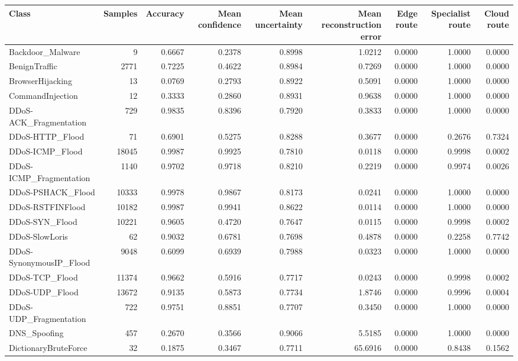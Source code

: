 \begin{tabular}{lrrrrrrrr}
\toprule
Class & Samples & Accuracy & Mean confidence & Mean uncertainty & Mean reconstruction error & Edge route & Specialist route & Cloud route \\
\midrule
Backdoor\_Malware & 9 & 0.6667 & 0.2378 & 0.8998 & 1.0212 & 0.0000 & 1.0000 & 0.0000 \\
BenignTraffic & 2771 & 0.7225 & 0.4622 & 0.8984 & 0.7269 & 0.0000 & 1.0000 & 0.0000 \\
BrowserHijacking & 13 & 0.0769 & 0.2793 & 0.8922 & 0.5091 & 0.0000 & 1.0000 & 0.0000 \\
CommandInjection & 12 & 0.3333 & 0.2860 & 0.8931 & 0.9638 & 0.0000 & 1.0000 & 0.0000 \\
DDoS-ACK\_Fragmentation & 729 & 0.9835 & 0.8396 & 0.7920 & 0.3833 & 0.0000 & 1.0000 & 0.0000 \\
DDoS-HTTP\_Flood & 71 & 0.6901 & 0.5275 & 0.8288 & 0.3677 & 0.0000 & 0.2676 & 0.7324 \\
DDoS-ICMP\_Flood & 18045 & 0.9987 & 0.9925 & 0.7810 & 0.0118 & 0.0000 & 0.9998 & 0.0002 \\
DDoS-ICMP\_Fragmentation & 1140 & 0.9702 & 0.9718 & 0.8210 & 0.2219 & 0.0000 & 0.9974 & 0.0026 \\
DDoS-PSHACK\_Flood & 10333 & 0.9978 & 0.9867 & 0.8173 & 0.0241 & 0.0000 & 1.0000 & 0.0000 \\
DDoS-RSTFINFlood & 10182 & 0.9987 & 0.9941 & 0.8622 & 0.0114 & 0.0000 & 1.0000 & 0.0000 \\
DDoS-SYN\_Flood & 10221 & 0.9605 & 0.4720 & 0.7647 & 0.0115 & 0.0000 & 0.9998 & 0.0002 \\
DDoS-SlowLoris & 62 & 0.9032 & 0.6781 & 0.7698 & 0.4878 & 0.0000 & 0.2258 & 0.7742 \\
DDoS-SynonymousIP\_Flood & 9048 & 0.6099 & 0.6939 & 0.7988 & 0.0323 & 0.0000 & 1.0000 & 0.0000 \\
DDoS-TCP\_Flood & 11374 & 0.9662 & 0.5916 & 0.7717 & 0.0243 & 0.0000 & 0.9998 & 0.0002 \\
DDoS-UDP\_Flood & 13672 & 0.9135 & 0.5873 & 0.7734 & 1.8746 & 0.0000 & 0.9996 & 0.0004 \\
DDoS-UDP\_Fragmentation & 722 & 0.9751 & 0.8851 & 0.7707 & 0.3450 & 0.0000 & 1.0000 & 0.0000 \\
DNS\_Spoofing & 457 & 0.2670 & 0.3566 & 0.9066 & 5.5185 & 0.0000 & 1.0000 & 0.0000 \\
DictionaryBruteForce & 32 & 0.1875 & 0.3467 & 0.7711 & 65.6916 & 0.0000 & 0.8438 & 0.1562 \\

\end{tabular}
